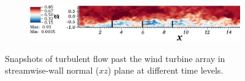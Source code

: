 \begin{figure}
\begin{subfigure}[t]{0.85\textwidth}
                \caption{}
                \label{fig:snap5}
        \end{subfigure}
        \centering
        \begin{subfigure}[t]{0.85\textwidth}
                \includegraphics[width=\linewidth]{movie_xz_cropped/movie_xz_38.png}
                \caption{}
                \label{fig:snap6}
        \end{subfigure}
        \caption[Temporal Snapshots in $xy$ plane]{Snapshots of turbulent flow past the wind turbine array in streamwise-wall normal ($xz$) plane at different time levels.}\label{fig:snap_xz}
\end{figure}

